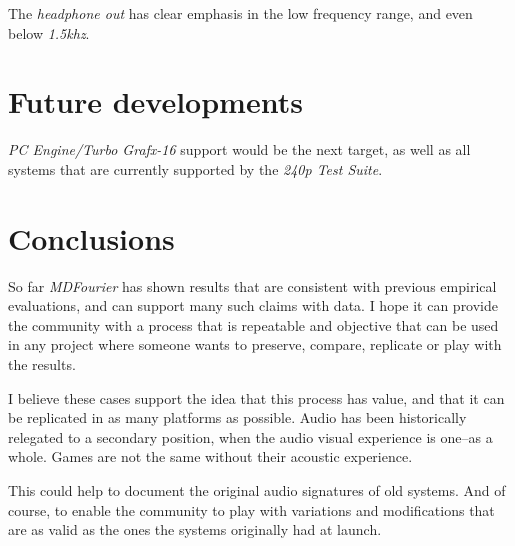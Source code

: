 \documentclass[10pt,a4paper]{report}
\newcommand{\khz}[1]{\textit{#1\acrshort{khz}}}
\begin{document}
The \textit{headphone out} has clear emphasis in the low frequency range, and even below \khz{1.5}.

\chapter{Future developments}

\textit{PC Engine/Turbo Grafx-16} support would be the next target, as well as all systems that are currently supported by the \textit{240p Test Suite}.

\chapter{Conclusions}

So far \textit{MDFourier} has shown results that are consistent with previous empirical evaluations, and can support many such claims with data. I hope it can provide the community with a process that is repeatable and objective that can be used in any project where someone wants to preserve, compare, replicate or play with the results.

I believe these cases support the idea that this process has value, and that it can be replicated in as many platforms as possible. Audio has been historically relegated to a secondary position, when the audio visual experience is one--as a whole. Games are not the same without their acoustic experience.

This could help to document the original audio signatures of old systems. And of course, to enable the community to play with variations and modifications that are as valid as the ones the systems originally had at launch.
\end{document}
